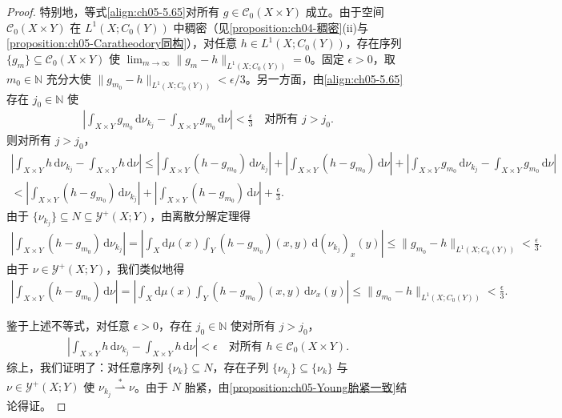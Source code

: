 \documentclass[../../main.tex]{subfiles}%
\begin{document}
\begin{proof}
特别地，等式\eqref{align:ch05-5.65}对所有 $g\in\mathcal{C}_0(X\times Y)$ 成立。由于空间 $\mathcal{C}_0(X\times Y)$ 在 $L^1(X;C_0(Y))$ 中稠密（见\cref{proposition:ch04-稠密}(ii)与\cref{proposition:ch05-Caratheodory同构}），对任意 $h\in L^1(X;C_0(Y))$，存在序列 $\{g_m\}\subseteq\mathcal{C}_0(X\times Y)$ 使 $\lim_{m\to\infty}\|g_m-h\|_{L^1(X;C_0(Y))}=0$。固定 $\epsilon>0$，取 $m_0\in\mathbb{N}$ 充分大使 $\|g_{m_0}-h\|_{L^1(X;C_0(Y))}<\epsilon/3$。另一方面，由\eqref{align:ch05-5.65}存在 $j_0\in\mathbb{N}$ 使
\begin{align*}
\left|\int_{X\times Y}g_{m_0}\,\mathrm{d}\nu_{k_j}-\int_{X\times Y}g_{m_0}\,\mathrm{d}\nu\right|<\frac{\epsilon}{3}
\quad\text{对所有 }j>j_0.
\end{align*}
则对所有 $j>j_0$，
\begin{align*}
\left|\int_{X\times Y}h\,\mathrm{d}\nu_{k_j}-\int_{X\times Y}h\,\mathrm{d}\nu\right|
\leqslant\left|\int_{X\times Y}(h-g_{m_0})\,\mathrm{d}\nu_{k_j}\right|
+\left|\int_{X\times Y}(h-g_{m_0})\,\mathrm{d}\nu\right|
+\left|\int_{X\times Y}g_{m_0}\,\mathrm{d}\nu_{k_j}-\int_{X\times Y}g_{m_0}\,\mathrm{d}\nu\right|\\
<\left|\int_{X\times Y}(h-g_{m_0})\,\mathrm{d}\nu_{k_j}\right|
+\left|\int_{X\times Y}(h-g_{m_0})\,\mathrm{d}\nu\right|
+\frac{\epsilon}{3}.
\end{align*}
由于 $\{\nu_{k_j}\}\subseteq N\subseteq\mathcal{Y}^+(X;Y)$，由离散分解定理得
\begin{align*}
\left|\int_{X\times Y}(h-g_{m_0})\,\mathrm{d}\nu_{k_j}\right|
=\left|\int_X\mathrm{d}\mu(x)\int_Y(h-g_{m_0})(x,y)\,\mathrm{d}(\nu_{k_j})_x(y)\right|
\leqslant\|g_{m_0}-h\|_{L^1(X;C_0(Y))}<\frac{\epsilon}{3}.
\end{align*}
由于 $\nu\in\mathcal{Y}^+(X;Y)$，我们类似地得
\begin{align*}
\left|\int_{X\times Y}(h-g_{m_0})\,\mathrm{d}\nu\right|
=\left|\int_X\mathrm{d}\mu(x)\int_Y(h-g_{m_0})(x,y)\,\mathrm{d}\nu_x(y)\right|
\leqslant\|g_{m_0}-h\|_{L^1(X;C_0(Y))}<\frac{\epsilon}{3}.
\end{align*}

鉴于上述不等式，对任意 $\epsilon>0$，存在 $j_0\in\mathbb{N}$ 使对所有 $j>j_0$，
\begin{align*}
\left|\int_{X\times Y}h\,\mathrm{d}\nu_{k_j}-\int_{X\times Y}h\,\mathrm{d}\nu\right|<\epsilon
\quad\text{对所有 }h\in\mathcal{C}_0(X\times Y).
\end{align*}
综上，我们证明了：对任意序列 $\{\nu_k\}\subseteq N$，存在子列 $\{\nu_{k_j}\}\subseteq\{\nu_k\}$ 与 $\nu\in\mathcal{Y}^+(X;Y)$ 使 $\nu_{k_j}\stackrel{*}{\rightharpoonup}\nu$。由于 $N$ 胎紧，由\cref{proposition:ch05-Young胎紧一致}结论得证。
\end{proof}
\end{document}

